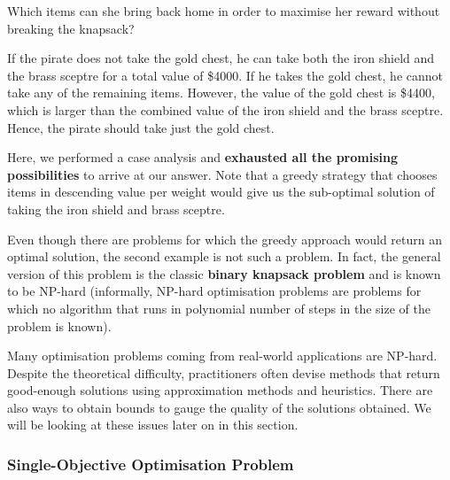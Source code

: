 \begin{enumerate}
  Which items can she bring back home in order to maximise her reward without breaking the knapsack?

  If the pirate does not take the gold chest, he
  can take both the iron shield and the brass sceptre for a total value
  of \$4000. If he takes the gold chest, he cannot take any of the
  remaining items. However, the value of the gold chest is \$4400, which
  is larger than the combined value of the iron shield and the brass
  sceptre. Hence, the pirate should take just the gold chest.

  Here, we performed a case analysis and \textbf{exhausted all the
  promising possibilities} to arrive at our answer. Note that a greedy
  strategy that chooses items in descending value per weight would give
  us the sub-optimal solution of taking the iron shield and brass
  sceptre. 
 \end{enumerate} 
  Even though there are problems for which the greedy approach
  would return an optimal solution, the second example is not such a problem.
  In fact, the general version of this problem is the classic \textbf{binary
  knapsack problem} and is known to be NP-hard  (informally, NP-hard
  optimisation problems are problems for which no algorithm that runs in
  polynomial number of steps in the size of the problem is known).

  Many optimisation problems coming from real-world applications are
  NP-hard. Despite the theoretical difficulty, practitioners often
  devise methods that return good-enough solutions using approximation
  methods and heuristics. There are also ways to obtain bounds to gauge
  the quality of the solutions obtained. We will be looking at these
  issues later on in this section.
\subsubsection{Single-Objective Optimisation
Problem}

